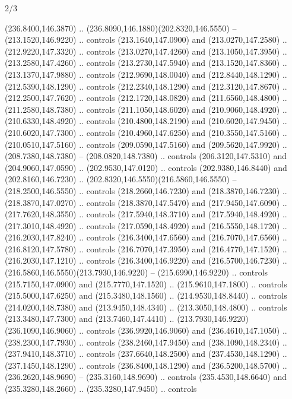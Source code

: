 \begin{flagdescription}{2/3}
\begin{scope}[xshift=0.5\flaglength,yshift=0.5\flagwidth,scale=\flagwidth/259.2]
\begin{scope}[y=0.8pt, x=0.8pt, yscale=-1,shift={(-243,-162)}]
      (236.8400,146.3870) .. (236.8090,146.1880)(202.8320,146.5550) --
      (213.1520,146.9220) .. controls (213.1640,147.0900) and (213.0270,147.2580) ..
      (212.9220,147.3320) .. controls (213.0270,147.4260) and (213.1050,147.3950) ..
      (213.2580,147.4260) .. controls (213.2730,147.5940) and (213.1520,147.8360) ..
      (213.1370,147.9880) .. controls (212.9690,148.0040) and (212.8440,148.1290) ..
      (212.5390,148.1290) .. controls (212.2340,148.1290) and (212.3120,147.8670) ..
      (212.2500,147.7620) .. controls (212.1720,148.0820) and (211.6560,148.4800) ..
      (211.2580,148.7380) .. controls (211.1050,148.6020) and (210.9060,148.4920) ..
      (210.6330,148.4920) .. controls (210.4800,148.2190) and (210.6020,147.9450) ..
      (210.6020,147.7300) .. controls (210.4960,147.6250) and (210.3550,147.5160) ..
      (210.0510,147.5160) .. controls (209.0590,147.5160) and (209.5620,147.9920) ..
      (208.7380,148.7380) -- (208.0820,148.7380) .. controls (206.3120,147.5310) and
      (204.9060,147.0590) .. (202.9530,147.0120) .. controls (202.9380,146.8440) and
      (202.8160,146.7230) .. (202.8320,146.5550)(216.5860,146.5550) --
      (218.2500,146.5550) .. controls (218.2660,146.7230) and (218.3870,146.7230) ..
      (218.3870,147.0270) .. controls (218.3870,147.5470) and (217.9450,147.6090) ..
      (217.7620,148.3550) .. controls (217.5940,148.3710) and (217.5940,148.4920) ..
      (217.3010,148.4920) .. controls (217.0590,148.4920) and (216.5550,148.1720) ..
      (216.2030,147.8240) .. controls (216.3400,147.6560) and (216.7070,147.6560) ..
      (216.8120,147.5780) .. controls (216.7070,147.3950) and (216.4770,147.1520) ..
      (216.2030,147.1210) .. controls (216.3400,146.9220) and (216.5700,146.7230) ..
      (216.5860,146.5550)(213.7930,146.9220) -- (215.6990,146.9220) .. controls
      (215.7150,147.0900) and (215.7770,147.1520) .. (215.9610,147.1800) .. controls
      (215.5000,147.6250) and (215.3480,148.1560) .. (214.9530,148.8440) .. controls
      (214.0200,148.7380) and (213.9450,148.4340) .. (213.3050,148.4800) .. controls
      (213.3480,147.7300) and (213.7460,147.4410) ..
      (213.7930,146.9220)(236.1090,146.9060) .. controls (236.9920,146.9060) and
      (236.4610,147.1050) .. (238.2300,147.7930) .. controls (238.2460,147.9450) and
      (238.1090,148.2340) .. (237.9410,148.3710) .. controls (237.6640,148.2500) and
      (237.4530,148.1290) .. (237.1450,148.1290) .. controls (236.8400,148.1290) and
      (236.5200,148.5700) .. (236.2620,148.9690) -- (235.3160,148.9690) .. controls
      (235.4530,148.6640) and (235.3280,148.2660) .. (235.3280,147.9450) .. controls

\end{scope}
\end{scope}
\end{flagdescription}
